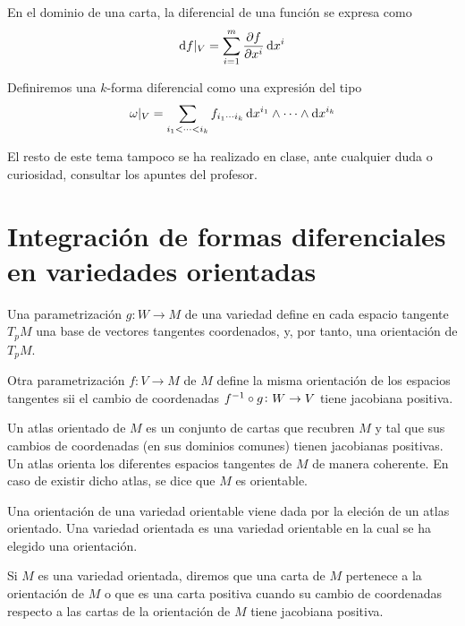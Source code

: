 \begin{prop}
    En el dominio de una carta, la diferencial de una función se expresa como
    \[
        \dif f \vert_V = \sum^m_{i= 1} \frac{\partial f}{\partial x^i} \dif x^i
    \]
\end{prop}

\begin{defi}
    Definiremos una $k$-forma diferencial como una expresión del tipo
    \[
        \omega\vert_V = \sum_{i_1 < \cdots < i_k} f_{i_1 \cdots i_k} \dif x^{i_1} \wedge \cdots \wedge \dif x^{i_k}
    \]
\end{defi}

El resto de este tema tampoco se ha realizado en clase, ante cualquier duda o curiosidad, consultar los apuntes del profesor.

\section{Integración de formas diferenciales en variedades orientadas}

\begin{defi}
    Una parametrización $g \colon W \to M$ de una variedad define en cada espacio tangente $T_pM$ una base de vectores tangentes
    coordenados, y, por tanto, una orientación de $T_pM$.

    Otra parametrización $f \colon V \to M$ de $M$ define la misma orientación de los espacios tangentes sii el cambio de coordenadas
    $f^{-1} \circ g \colon W \to V$ tiene jacobiana positiva.
\end{defi}

\begin{defi}
    Un atlas orientado de $M$ es un conjunto de cartas que recubren $M$ y tal que sus cambios de coordenadas (en sus dominios comunes)
    tienen jacobianas positivas. Un atlas orienta los diferentes espacios tangentes de $M$ de manera coherente. En caso de existir dicho atlas,
    se dice que $M$ es orientable.
\end{defi}

\begin{defi}
    Una orientación de una variedad orientable viene dada por la eleción de un atlas orientado. Una variedad orientada es una variedad
    orientable en la cual se ha elegido una orientación.
\end{defi}

\begin{defi}
    Si $M$ es una variedad orientada, diremos que una carta de $M$ pertenece a la orientación de $M$ o que es una carta positiva cuando su
    cambio de coordenadas respecto a las cartas de la orientación de $M$ tiene jacobiana positiva.
\end{defi}

